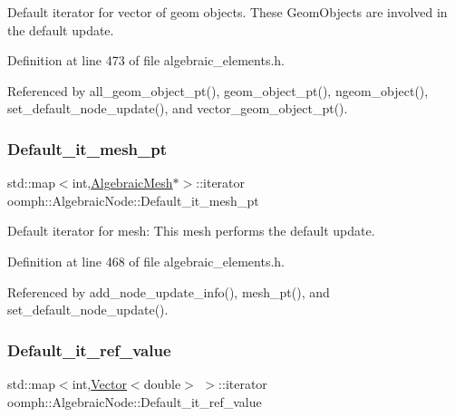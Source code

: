 Default iterator for vector of geom objects. These Geom\+Objects are involved in the default update. 



Definition at line 473 of file algebraic\+\_\+elements.\+h.



Referenced by all\+\_\+geom\+\_\+object\+\_\+pt(), geom\+\_\+object\+\_\+pt(), ngeom\+\_\+object(), set\+\_\+default\+\_\+node\+\_\+update(), and vector\+\_\+geom\+\_\+object\+\_\+pt().

\mbox{\label{classoomph_1_1AlgebraicNode_ac8cb7e56e80f1c0f3e200562d2b1d39e}} 
\subsubsection{\texorpdfstring{Default\+\_\+it\+\_\+mesh\+\_\+pt}{Default\_it\_mesh\_pt}}
{\footnotesize\ttfamily std\+::map$<$int,\hyperlink{classoomph_1_1AlgebraicMesh}{Algebraic\+Mesh}$\ast$$>$\+::iterator oomph\+::\+Algebraic\+Node\+::\+Default\+\_\+it\+\_\+mesh\+\_\+pt\hspace{0.3cm}{\ttfamily [private]}}



Default iterator for mesh\+: This mesh performs the default update. 



Definition at line 468 of file algebraic\+\_\+elements.\+h.



Referenced by add\+\_\+node\+\_\+update\+\_\+info(), mesh\+\_\+pt(), and set\+\_\+default\+\_\+node\+\_\+update().

\mbox{\label{classoomph_1_1AlgebraicNode_a49673336a201aca02390f13ceb72dd19}} 
\subsubsection{\texorpdfstring{Default\+\_\+it\+\_\+ref\+\_\+value}{Default\_it\_ref\_value}}
{\footnotesize\ttfamily std\+::map$<$int,\hyperlink{classoomph_1_1Vector}{Vector}$<$double$>$ $>$\+::iterator oomph\+::\+Algebraic\+Node\+::\+Default\+\_\+it\+\_\+ref\+\_\+value\hspace{0.3cm}{\ttfamily [private]}}

